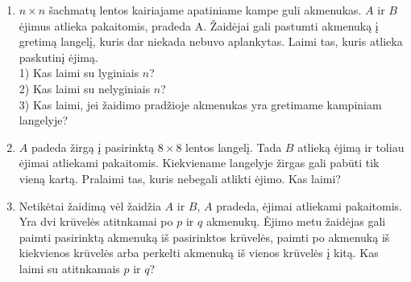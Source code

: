 \begin{enumerate}
  \item  $n\times n$ šachmatų lentos kairiajame apatiniame kampe guli akmenukas.
    $A$ ir $B$ ėjimus atlieka pakaitomis, pradeda A. Žaidėjai gali pastumti
    akmenuką į gretimą langelį, kuris dar niekada nebuvo aplankytas. Laimi tas,
    kuris atlieka paskutinį ėjimą.\\
    1) Kas laimi su lyginiais $n$? \\
    2) Kas laimi su nelyginiais $n$? \\
    3) Kas laimi, jei žaidimo pradžioje akmenukas yra gretimame kampiniam langelyje?

  \item $A$ padeda žirgą  į pasirinktą  $8\times 8$ lentos langelį. Tada $B$
    atlieką ėjimą ir toliau ėjimai atliekami pakaitomis. Kiekviename
    langelyje žirgas gali pabūti tik vieną kartą. Pralaimi tas, kuris
    nebegali atlikti ėjimo. Kas laimi?

  \item Netikėtai žaidimą vėl žaidžia $A$ ir $B$, $A$ pradeda, ėjimai atliekami
    pakaitomis. Yra dvi krūvelės atitnkamai po $p$ ir $q$ akmenukų. Ėjimo metu
    žaidėjas gali paimti pasirinktą akmenuką iš pasirinktos krūvelės, paimti po
    akmenuką iš kiekvienos krūvelės arba perkelti akmenuką iš vienos krūvelės į
    kitą. Kas laimi su atitnkamais $p$ ir $q$?


\end{enumerate}
